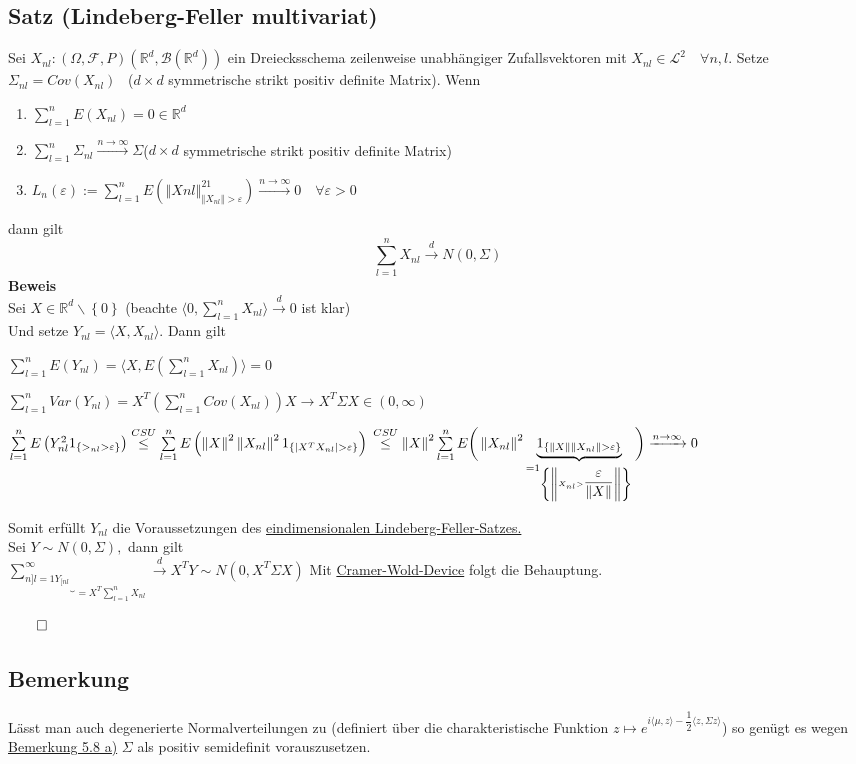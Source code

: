 \documentclass[german,10pt,oneside, fleqn, a4paper]{article}
\newcommand {\R}	{\mathbb{R}}
\newcommand{\ra}{\rightarrow}
\newcommand{\sm}[2][\infty]{\sum\limits_{#2}^{#1}}
\newcommand{\brc}[1]{\left(#1\right)}
\newcommand{\brac}[1]{\left\lbrace #1\right\rbrace}
\newcommand{\norm}[1]{\left\Vert #1 \right\Vert}
\newcommand{\QED}{\begin{flushright}$\qed$\end{flushright}}
\newcommand{\mc}[1]{\mathcal{#1}}
\newcommand{\lp}[1]{\mc{L}^{#1}}
\newcommand{\beweis}{\textbf{Beweis}\\}
\newcommand{\toinf}{\rightarrow\infty}
\newcommand{\1}[1]{1_{#1}}
\newcommand{\2}[1]{\1{\brac{#1}}}
\newcommand{\xr}[2][]{\xrightarrow[#1]{#2}}
\newcommand{\rbor}[1][d]{\brc{\R^{#1},\mc{B}\brc{\R^{#1}}}}
\newcommand{\raum}{\brc{\Omega,\mc{F},P}}
\begin{document}
\subsection{Satz (Lindeberg-Feller multivariat)}
\label{5.10}
Sei $X_{nl}:\raum\rbor$ ein Dreiecksschema zeilenweise unabhängiger Zufallsvektoren mit $X_{nl}\in\lp{2}\quad\forall n,l$. Setze $\Sigma_{nl}=Cov(X_{nl})$ \ ($d\times d$ symmetrische strikt positiv definite Matrix). Wenn\begin{enumerate}[label=(\alph*)]
\item $\sm[n]{l=1}E(X_{nl})=0\in\R^d$
\item $\sm[n]{l=1}\Sigma_{nl}\xr{n\toinf}\Sigma $($d\times d$ symmetrische strikt positiv definite Matrix)
\item $L_n(\varepsilon):=\sm[n]{l=1}E\brc{\norm{X{nl}}^2\1{\norm{X_{nl}}>\varepsilon}}\xr{n\toinf}0\quad\forall\varepsilon>0$
\end{enumerate}
dann gilt \[\sm[n]{l=1}X_{nl}\xr{d}N(0,\Sigma)\]
\beweis
Sei $X\in\R^d\backslash\brac{0}$ (beachte $\langle 0,\sm[n]{l=1}X_{nl}\rangle\xr{d}0$ ist klar)\\
Und setze $Y_{nl}=\langle X, X_{nl}\rangle$. Dann gilt\begin{list}{•}{}
\item $\sm[n]{l=1}E(Y_{nl})=\langle X,E\brc{\sm[n]{l=1}X_{nl}}\rangle=0$
\item  $\sm[n]{l=1}Var(Y_{nl})=X^T\brc{\sm[n]{l=1}Cov(X_{nl})}X\ra X^T\Sigma X\in(0,\infty)$
\item $\sm[n]{l=1}E\brc{Y_{nl}^2\2{>_{nl}>\varepsilon}}\overset{CSU}{\le}\sm[n]{l=1}E\brc{\norm{X}^2\norm{X_{nl}}^2\2{|X^TX_{nl}|>\varepsilon}}\\
\overset{CSU}{\le}\norm{X}^2\sm[n]{l=1}E\bigg(\norm{X_{nl}}^2\underbrace{\2{\norm{X}\norm{X_{nl}}>\varepsilon}}_{=\2{\norm{X_{nl}>\dfrac{\varepsilon}{\norm{X}}}}}\bigg)\xr{n\toinf}0$
\end{list}
Somit erfüllt $Y_{nl}$ die Voraussetzungen des  \hyperref[5.4]{eindimensionalen Lindeberg-Feller-Satzes.}\\
Sei $Y\sim N(0,\Sigma),$ dann gilt\\
$\underbrace{\sm{n]{l=1}Y_{[nl}}}_{=X^T\sm[n]{l=1}X_{nl}}\xr{d}X^TY\sim N(0,X^T\Sigma X)$
Mit \hyperref[4.13]{Cramer-Wold-Device} folgt die Behauptung.\QED
 
\subsection{Bemerkung}
\label{5.11}
Lässt man auch degenerierte Normalverteilungen zu (definiert über die charakteristische Funktion $z\mapsto e^{i\langle\mu,z\rangle-\dfrac{1}{2}\langle z,\Sigma z\rangle}$) so genügt es wegen \hyperref[5.8]{Bemerkung 5.8 a)} $\Sigma$ als positiv semidefinit vorauszusetzen.
\end{document}

